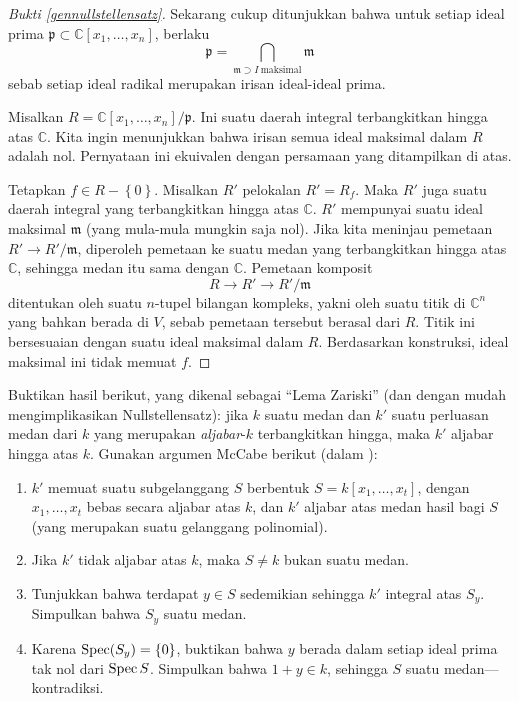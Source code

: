 \begin{proof}[Bukti \cref{gennullstellensatz}] 
Sekarang cukup ditunjukkan bahwa untuk setiap ideal prima $\mathfrak{p} \subset \mathbb{C}[x_1,
\dots, x_n]$, berlaku
\[ \mathfrak{p} = \bigcap_{\mathfrak{m} \supset I \ \mathrm{maksimal}}
\mathfrak{m}  \]
sebab setiap ideal radikal merupakan irisan ideal-ideal prima.

Misalkan $R = \mathbb{C}[x_1, \dots,
x_n]/\mathfrak{p}$. Ini suatu daerah integral terbangkitkan hingga atas $\mathbb{C}$. Kita
ingin menunjukkan bahwa irisan semua ideal maksimal dalam $R$ adalah nol. Pernyataan ini
ekuivalen dengan persamaan yang ditampilkan di atas.

Tetapkan $f \in R - \left\{0\right\}$. Misalkan $R'$ pelokalan $R'= R_f$. Maka $R'$ juga suatu
daerah integral yang terbangkitkan hingga atas $\mathbb{C}$.	$R'$ mempunyai suatu ideal maksimal
$\mathfrak{m}$ (yang mula-mula mungkin saja nol). Jika kita
meninjau pemetaan $R' \to R'/\mathfrak{m}$, diperoleh pemetaan ke suatu medan yang
terbangkitkan hingga
atas $\mathbb{C}$, sehingga medan itu sama dengan $\mathbb{C}$.
Pemetaan komposit
\[ R \to  R' \to R'/\mathfrak{m}   \]
ditentukan oleh suatu $n$-tupel bilangan kompleks, yakni oleh suatu titik di
$\mathbb{C}^n$ yang bahkan berada di $V$, sebab pemetaan tersebut berasal dari $R$. Titik ini bersesuaian
dengan suatu ideal maksimal dalam $R$.
Berdasarkan konstruksi, ideal maksimal ini tidak memuat $f$.
\end{proof}

\begin{exercise} 
Buktikan hasil berikut, yang dikenal sebagai ``Lema Zariski'' (dan dengan mudah mengimplikasikan
Nullstellensatz): jika $k$ suatu medan dan $k'$ suatu perluasan medan dari $k$ yang
merupakan \emph{aljabar}-$k$ terbangkitkan hingga, maka $k'$ aljabar hingga atas
$k$. Gunakan argumen McCabe berikut (dalam \cite{Mc76}):
\begin{enumerate}
\item $k'$ memuat suatu subgelanggang $S$ berbentuk $S= k[ x_1, \dots, x_t]$, dengan
$x_1, \dots, x_t$ bebas secara aljabar atas $k$, dan $k'$ aljabar
atas medan hasil bagi $S$ (yang merupakan suatu gelanggang polinomial). 
\item Jika $k'$ tidak aljabar atas $k$, maka $S \neq k$ bukan suatu medan.
\item Tunjukkan bahwa terdapat $y \in S$ sedemikian sehingga $k'$ integral atas $S_y$.
Simpulkan bahwa $S_y$ suatu medan.
\item Karena $\operatorname{Spec} (S_y) = \left\{0\right\}$, buktikan bahwa $y$ berada dalam setiap
ideal prima tak nol dari $\operatorname{Spec} S$. Simpulkan bahwa $1+y \in k$, sehingga $S$ suatu
medan---kontradiksi.
\end{enumerate}
\end{exercise} 


